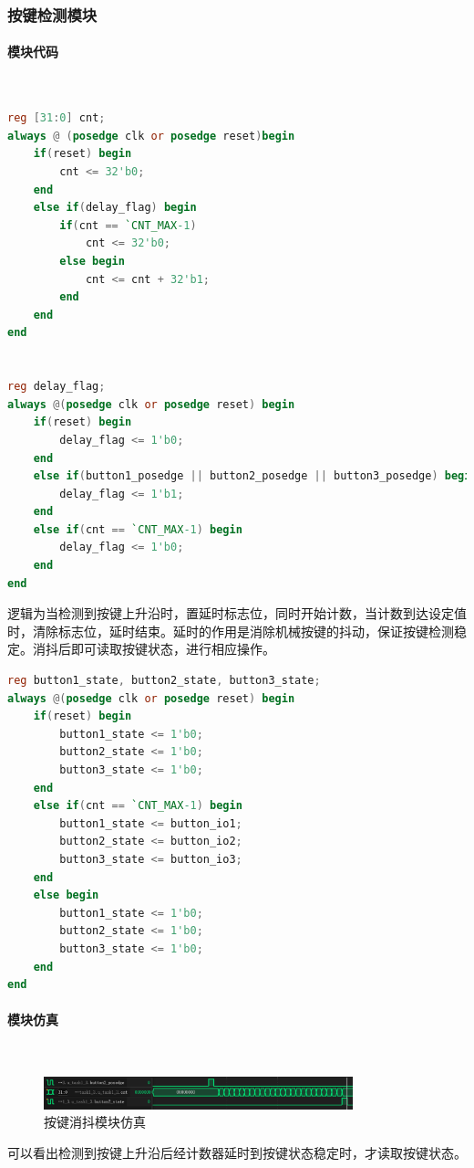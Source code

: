\documentclass[UTF8]{ctexart}
\newcommand{\subsubsubsection}[1]{\paragraph{#1}\mbox{}\\}
\begin{document}
\subsubsection{按键检测模块}
\subsubsubsection{模块代码}
\begin{framed}
    \begin{lstlisting}[language=verilog,style=verilogStyle]
reg [31:0] cnt;
always @ (posedge clk or posedge reset)begin
    if(reset) begin
        cnt <= 32'b0;
    end
    else if(delay_flag) begin
        if(cnt == `CNT_MAX-1)
            cnt <= 32'b0;
        else begin
            cnt <= cnt + 32'b1;
        end
    end
end


reg delay_flag; 
always @(posedge clk or posedge reset) begin
    if(reset) begin
        delay_flag <= 1'b0;
    end
    else if(button1_posedge || button2_posedge || button3_posedge) begin
        delay_flag <= 1'b1;
    end
    else if(cnt == `CNT_MAX-1) begin
        delay_flag <= 1'b0;
    end
end
\end{lstlisting}
\end{framed}
逻辑为当检测到按键上升沿时，置延时标志位，同时开始计数，当计数到达设定值时，清除标志位，延时结束。延时的作用是消除机械按键的抖动，保证按键检测稳定。消抖后即可读取按键状态，进行相应操作。
\begin{framed}
    \begin{lstlisting}[language=verilog,style=verilogStyle]
reg button1_state, button2_state, button3_state;
always @(posedge clk or posedge reset) begin
    if(reset) begin
        button1_state <= 1'b0;
        button2_state <= 1'b0;
        button3_state <= 1'b0;
    end
    else if(cnt == `CNT_MAX-1) begin
        button1_state <= button_io1;
        button2_state <= button_io2;
        button3_state <= button_io3;
    end
    else begin
        button1_state <= 1'b0;
        button2_state <= 1'b0;
        button3_state <= 1'b0;
    end
end
    \end{lstlisting}
\end{framed}

\subsubsubsection{模块仿真}
\begin{figure}[H]
    \centering
    \includegraphics[width=0.8\textwidth]{task1_3_2.png}
    \caption{按键消抖模块仿真}
\end{figure}
可以看出检测到按键上升沿后经计数器延时到按键状态稳定时，才读取按键状态。
\end{document}
